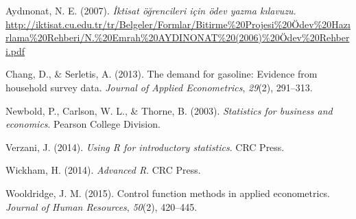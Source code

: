 \documentclass[
  12pt,
]{article}
\newlength{\cslhangindent}
\newlength{\cslentryspacingunit} %
\newenvironment{CSLReferences}[2] %
 {%
  \setlength{\parindent}{0pt}
  \ifodd #1
  \let\oldpar\par
  \def\par{\hangindent=\cslhangindent\oldpar}
  \fi
  \setlength{\parskip}{#2\cslentryspacingunit}
 }%
 {}
\begin{document}
\hypertarget{refs}{}
\begin{CSLReferences}{1}{0}
\leavevmode{}%
Aydınonat, N. E. (2007). \emph{İktisat öğrencileri için ödev yazma kılavuzu}. \url{http://iktisat.cu.edu.tr/tr/Belgeler/Formlar/Bitirme\%20Projesi\%20Ödev\%20Hazırlama\%20Rehberi/N.\%20Emrah\%20AYDINONAT\%20(2006)\%20Ödev\%20Rehberi.pdf}

\leavevmode{}%
Chang, D., \& Serletis, A. (2013). The demand for gasoline: Evidence from household survey data. \emph{Journal of Applied Econometrics}, \emph{29}(2), 291--313.

\leavevmode{}%
Newbold, P., Carlson, W. L., \& Thorne, B. (2003). \emph{Statistics for business and economics}. Pearson College Division.

\leavevmode{}%
Verzani, J. (2014). \emph{Using {R} for introductory statistics}. CRC Press.

\leavevmode{}%
Wickham, H. (2014). \emph{Advanced {R}}. CRC Press.

\leavevmode{}%
Wooldridge, J. M. (2015). Control function methods in applied econometrics. \emph{Journal of Human Resources}, \emph{50}(2), 420--445.

\end{CSLReferences}
\end{document}
